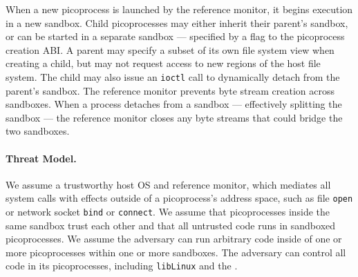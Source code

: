 

When a new picoprocess is launched by the reference monitor, it begins execution in 
a new sandbox.  
Child picoprocesses may either inherit their parent's sandbox, 
or can be started in a separate sandbox
--- specified by a flag to the picoprocess creation ABI.
A parent may specify a subset of its own file system view 
when creating a child, but may not request access to new regions of the 
host file system. 
The child may also issue an {\tt ioctl} call to 
dynamically detach from the parent's sandbox. The reference monitor prevents byte stream creation 
across sandboxes.
When a process detaches from a sandbox --- effectively splitting the sandbox ---
the reference monitor closes
any byte streams that could bridge the two sandboxes.

\paragraph{Threat Model.}
We assume  a trustworthy host OS and reference monitor,
which mediates all system calls with effects outside of a picoprocess's address space,
such as file {\tt open} or network socket {\tt bind} or {\tt connect}.
We assume that picoprocesses inside the same sandbox trust each other and that all untrusted code runs in sandboxed picoprocesses.
We assume the adversary can run arbitrary code inside of
one or more picoprocesses within one or more sandboxes.
The adversary can control all code in its
picoprocesses, including {\tt libLinux} and the \pal{}. 


